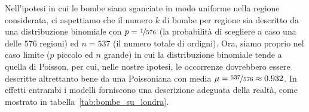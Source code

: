 \begin{table}[!htb]
\end{table}

Nell'ipotesi in cui le bombe siano sganciate in modo uniforme nella regione
considerata, ci aspettiamo che il numero $k$ di bombe per regione sia
descritto da una distribuzione binomiale con $p = \nicefrac{1}{576}$ (la
probabilità di scegliere a caso una delle $576$ regioni) ed $n = 537$ (il
numero totale di ordigni). Ora, siamo proprio nel caso limite ($p$ piccolo ed
$n$ grande) in cui la distribuzione binomiale tende a quella di Poisson, per
cui, nelle nostre ipotesi, le occorrenze dovrebbero essere descritte
altrettanto bene da una Poissoniana con media
$\mu = \nicefrac{537}{576} \approx 0.932$. In effetti entrambi i modelli
forniscono una descrizione adeguata della realtà, come mostrato in
tabella~\ref{tab:bombe_su_londra}.

